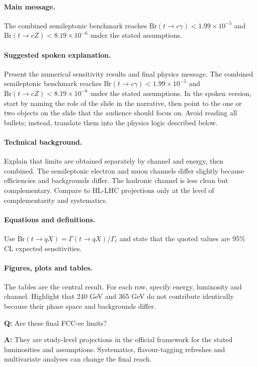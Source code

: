 \documentclass[11pt,a4paper]{report}
\newcommand{\br}{\mathrm{Br}}
\begin{document}
\paragraph{Main message.}
The combined semileptonic benchmark reaches $\br(t\to c\gamma)<1.99\times10^{-5}$ and $\br(t\to cZ)<8.19\times10^{-6}$ under the stated assumptions.

\paragraph{Suggested spoken explanation.}
Present the numerical sensitivity results and final physics message. The combined semileptonic benchmark reaches $\br(t\to c\gamma)<1.99\times10^{-5}$ and $\br(t\to cZ)<8.19\times10^{-6}$ under the stated assumptions. In the spoken version, start by naming the role of the slide in the narrative, then point to the one or two objects on the slide that the audience should focus on.  Avoid reading all bullets; instead, translate them into the physics logic described below.

\paragraph{Technical background.}
Explain that limits are obtained separately by channel and energy, then combined.  The semileptonic electron and muon channels differ slightly because efficiencies and backgrounds differ.  The hadronic channel is less clean but complementary.  Compare to HL-LHC projections only at the level of complementarity and systematics.

\paragraph{Equations and definitions.}
Use $\br(t\to qX)=\Gamma(t\to qX)/\Gamma_t$ and state that the quoted values are 95\% CL expected sensitivities.

\paragraph{Figures, plots and tables.}
The tables are the central result.  For each row, specify energy, luminosity and channel.  Highlight that 240 GeV and 365 GeV do not contribute identically because their phase space and backgrounds differ.

\begin{questionbox}
\textbf{Q:} Are these final FCC-ee limits?\par
\textbf{A:} They are study-level projections in the official framework for the stated luminosities and assumptions.  Systematics, flavour-tagging refreshes and multivariate analyses can change the final reach.
\end{questionbox}
\end{document}
